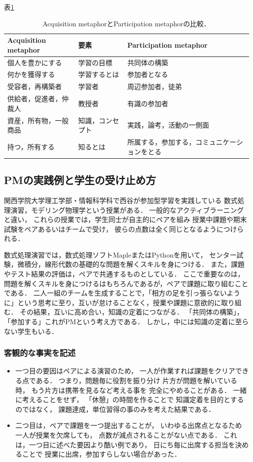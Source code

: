 \documentclass{jsarticle}
\begin{document}
表\ref{tab:org426efdf}

\begin{table}[bt]
\caption{\label{tab:org426efdf}
Acquisition metaphorとParticipation metaphorの比較．}
\centering
\begin{tabular}{lll}
\hline
Acquisition metaphor & 要素 & Participation metaphor\\
\hline
個人を豊かにする & 学習の目標 & 共同体の構築\\
何かを獲得する & 学習するとは & 参加者となる\\
受容者，再構築者 & 学習者 & 周辺参加者，徒弟\\
供給者，促進者，仲裁人 & 教授者 & 有識の参加者\\
資産，所有物，一般商品 & 知識，コンセプト & 実践，論考，活動の一側面\\
持つ，所有する & 知るとは & 所属する，参加する，コミュニケーションをとる\\
\hline
\end{tabular}
\end{table}

\subsection{PMの実践例と学生の受け止め方}
\label{sec:org8044cf8}
関西学院大学理工学部・情報科学科で西谷が参加型学習を実践している
数式処理演習，モデリング物理学という授業がある．
一般的なアクティブラーニングと違い，
これらの授業では，学生同士が自主的にペアを組み
授業中課題や期末試験をペアあるいはチームで受け，
彼らの点数は全く同じとなるようにつけられる．

数式処理演習では，数式処理ソフトMapleまたはPythonを用いて，
センター試験，微積分，線形代数の基礎的な問題を解くスキルを身につける．
また，課題やテスト結果の評価は，ペアで共通するものとしている．
ここで重要なのは，問題を解くスキルを身につけるはもちろんであるが，ペアで課題に取り組むことである．
二人一組のチームを生成することで，「相方の足を引っ張らないように」という思考に至り，互いが怠けることなく，授業や課題に意欲的に取り組む．
その結果，互いに高め合い，知識の定着につながる．
「共同体の構築」，「参加する」これがPMという考え方である．
しかし，中には知識の定着に至らない学生もいる．
\subsubsection{客観的な事実を記述}
\label{sec:org08a0259}
\begin{itemize}
\item 一つ目の要因はペアによる演習のため，
一人が作業すれば課題をクリアできる点である．
つまり，問題毎に役割を振り分け 
片方が問題を解いている時，
もう片方は携帯を見るなど考える事を
完全にやめることがある．
一緒に考えることをせず，
「休憩」の時間を作ることで
知識定着を目的とするのではなく，
課題達成，単位習得の事のみを考えた結果である．

\item 二つ目は，ペアで課題を一つ提出することが，
いわゆる出席点となるため
一人が授業を欠席しても，
点数が減点されることがない点である．
これは，一つ目に述べた要因より酷い例であり，
日にち毎に出席する担当を決めることで
授業に出席，参加すらしない場合があった．
\end{itemize}
\end{document}
